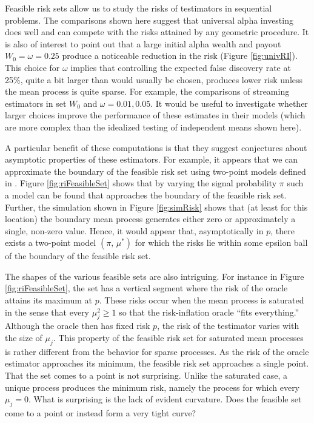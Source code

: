 \documentclass{gSCS2e}
\begin{document}
 Feasible risk sets allow us to study the risks of testimators in sequential problems.
  The comparisons shown here suggest that universal alpha investing does well and can
 compete with the risks attained by any geometric procedure.  It is also of interest to
 point out that a large initial alpha wealth and payout $W_0 = \omega = 0.25$ produce a
 noticeable reduction in the risk (Figure \ref{fig:univRI}).  This choice for $\omega$
 implies that controlling the expected false discovery rate at 25\%, quite a bit larger
 than would usually be chosen, produces lower risk unless the mean process is quite
 sparse.  For example, the comparisons of streaming estimators in \citet{wu13} set $W_0$
 and $\omega = 0.01, 0.05$.  It would be useful to investigate whether larger choices
 improve the performance of these estimates in their models (which are more complex than
 the idealized testing of independent means shown here).


 A particular benefit of these computations is that they suggest conjectures
 about asymptotic properties of these estimators.  For example, it appears that
 we can approximate the boundary of the feasible risk set using two-point models
 defined in .  Figure \ref{fig:riFeasibleSet} shows that by varying
 the signal probability $\pi$ such a model can be found that approaches the
 boundary of the feasible risk set.  Further, the simulation shown in Figure
 \ref{fig:simRisk} shows that (at least for this location) the boundary mean
 process generates either zero or approximately a single, non-zero value.
  Hence, it would appear that, asymptotically in $p$, there exists a two-point
 model $(\pi,\,\mu^{*})$ for which the risks lie within some epsilon ball of the
 boundary of the feasible risk set.


 The shapes of the various feasible sets are also intriguing.  For instance in
 Figure \ref{fig:riFeasibleSet}, the set has a vertical segment where the risk
 of the oracle attains its maximum at $p$.  These risks occur when the mean
 process is saturated in the sense that every $\mu_j^2 \ge 1$ so that the
 risk-inflation oracle ``fits everything.''  Although the oracle then has fixed
 risk $p$, the risk of the testimator varies with the size of $\mu_j$.  This
 property of the feasible risk set for saturated mean processes is rather
 different from the behavior for sparse processes.  As the risk of the oracle
 estimator approaches its minimum, the feasible risk set approaches a single
 point.  That the set comes to a point is not surprising.  Unlike the saturated
 case, a unique process produces the minimum risk, namely the process for which
 every $\mu_j = 0$.  What is surprising is the lack of evident curvature.  Does
 the feasible set come to a point or instead form a very tight curve?
 
\end{document}

